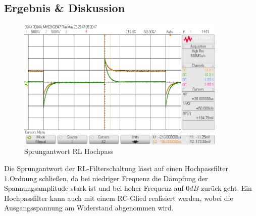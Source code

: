 \documentclass[12pt,a4paper,titlepage]{article}
\begin{document}
\subsection{Ergebnis \& Diskussion}
\begin{figure}[H]
  \centering
  \includegraphics[width=100mm]{sprungantwort_rl_hochpass.png}
  \caption{Sprungantwort RL Hochpass}
  \label{Figure07}
\end{figure}
\noindent Die Sprungantwort der RL-Filterschaltung l\"asst auf einen Hochpassfilter 1.Ordnung schlie\ss en, da bei niedriger Frequenz die D\"ampfung der Spannungsamplitude stark ist und bei hoher Frequenz auf $0 dB$ zur\"uck geht. Ein Hochpassfilter kann auch mit einem RC-Glied realisiert werden, wobei die Ausgangsspannung am Widerstand abgenommen wird.
\end{document}
